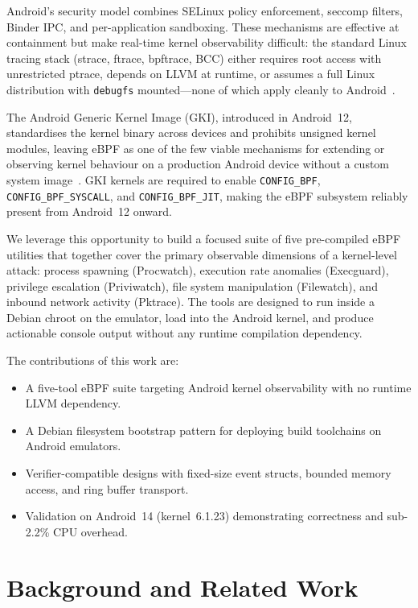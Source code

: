 \documentclass[conference]{IEEEtran}
\begin{document}
Android's security model combines SELinux policy enforcement, seccomp filters, Binder IPC, and per-application sandboxing. These mechanisms are effective at containment but make real-time kernel observability difficult: the standard Linux tracing stack (strace, ftrace, bpftrace, BCC) either requires root access with unrestricted ptrace, depends on LLVM at runtime, or assumes a full Linux distribution with \texttt{debugfs} mounted---none of which apply cleanly to Android~\cite{android_security,android_selinux}.

The Android Generic Kernel Image (GKI), introduced in Android~12, standardises the kernel binary across devices and prohibits unsigned kernel modules, leaving eBPF as one of the few viable mechanisms for extending or observing kernel behaviour on a production Android device without a custom system image~\cite{android_gki}. GKI kernels are required to enable \texttt{CONFIG\_BPF}, \texttt{CONFIG\_BPF\_SYSCALL}, and \texttt{CONFIG\_BPF\_JIT}, making the eBPF subsystem reliably present from Android~12 onward.

We leverage this opportunity to build a focused suite of five pre-compiled eBPF utilities that together cover the primary observable dimensions of a kernel-level attack: process spawning (Procwatch), execution rate anomalies (Execguard), privilege escalation (Priviwatch), file system manipulation (Filewatch), and inbound network activity (Pktrace). The tools are designed to run inside a Debian chroot on the emulator, load into the Android kernel, and produce actionable console output without any runtime compilation dependency.

The contributions of this work are:
\begin{itemize}
  \item A five-tool eBPF suite targeting Android kernel observability with no runtime LLVM dependency.
  \item A Debian filesystem bootstrap pattern for deploying build toolchains on Android emulators.
  \item Verifier-compatible designs with fixed-size event structs, bounded memory access, and ring buffer transport.
  \item Validation on Android~14 (kernel~6.1.23) demonstrating correctness and sub-2.2\% CPU overhead.
\end{itemize}

\section{Background and Related Work}
\end{document}
